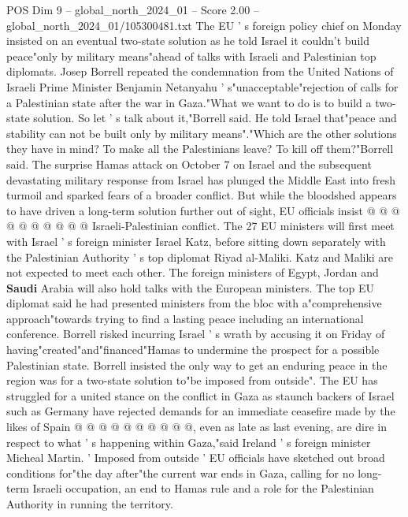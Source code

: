 \begin{textsample}{POS Dim 9 – global\_north\_2024\_01 – Score 2.00 – global\_north\_2024\_01/105300481.txt}  \label{ex:f9_pos_245}
The EU ' s foreign policy chief on Monday insisted on an eventual two-state solution as he told Israel it couldn't build peace"only by military means"ahead of talks with Israeli and Palestinian top diplomats.
Josep Borrell repeated the condemnation from the United Nations of Israeli Prime Minister Benjamin Netanyahu ' s"unacceptable"rejection of calls for a Palestinian state after the war in Gaza."What we want to do is to build a two-state solution.
So let ' s talk about it,"Borrell said.
He told Israel that"peace and stability can not be built only by military means"."Which are the other solutions they have in mind?
To make all the Palestinians leave?
To kill off them?"Borrell said.
The surprise Hamas attack on October 7 on Israel and the subsequent devastating military response from Israel has plunged the Middle East into fresh turmoil and sparked fears of a broader conflict.
But while the bloodshed appears to have driven a long-term solution further out of sight, EU officials insist @ @ @ @ @ @ @ @ @ @ Israeli-Palestinian conflict.
The 27 EU ministers will first meet with Israel ' s foreign minister Israel Katz, before sitting down separately with the Palestinian Authority ' s top diplomat Riyad al-Maliki.
Katz and Maliki are not expected to meet each other.
The foreign ministers of Egypt, Jordan and \textbf{Saudi} Arabia will also hold talks with the European ministers.
The top EU diplomat said he had presented ministers from the bloc with a"comprehensive approach"towards trying to find a lasting peace including an international conference.
Borrell risked incurring Israel ' s wrath by accusing it on Friday of having"created"and"financed"Hamas to undermine the prospect for a possible Palestinian state.
Borrell insisted the only way to get an enduring peace in the region was for a two-state solution to"be imposed from outside".
The EU has struggled for a united stance on the conflict in Gaza as staunch backers of Israel such as Germany have rejected demands for an immediate ceasefire made by the likes of Spain @ @ @ @ @ @ @ @ @ @, even as late as last evening, are dire in respect to what ' s happening within Gaza,"said Ireland ' s foreign minister Micheal Martin. ' Imposed from outside ' EU officials have sketched out broad conditions for"the day after"the current war ends in Gaza, calling for no long-term Israeli occupation, an end to Hamas rule and a role for the Palestinian Authority in running the territory.

\end{textsample}
